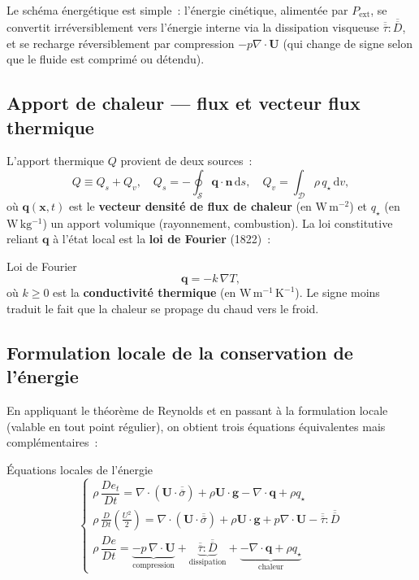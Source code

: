 \documentclass[11pt,a4paper]{report}
\newcommand{\DD}[1]{\dfrac{D #1}{Dt}}
\newcommand{\ten}[1]{\overline{\overline{#1}}}   %
\begin{document}
Le sch\'ema \'energ\'etique est simple~: l'\'energie cin\'etique, aliment\'ee par
$P_{\mathrm{ext}}$, se convertit irr\'eversiblement vers l'\'energie interne via la
dissipation visqueuse $\ten{\tau}:\ten{D}$, et se recharge r\'eversiblement
par compression $-p\nabla\cdot\bm{U}$ (qui change de signe selon que le fluide
est comprim\'e ou d\'etendu).

\subsection{Apport de chaleur --- flux et vecteur flux thermique}

L'apport thermique $Q$ provient de deux sources~:
\[
  Q \equiv Q_s + Q_v,
  \quad
  Q_s = -\oint_{\mathcal{S}} \bm{q} \cdot \bm{n}\,\mathrm{d}s,
  \quad
  Q_v = \int_{\mathcal{D}} \rho\,q_\star\,\mathrm{d}v,
\]
o\`u $\bm{q}(\bm{x},t)$ est le \textbf{vecteur densit\'e de flux de chaleur}
(en $\mathrm{W\,m^{-2}}$) et $q_\star$ (en $\mathrm{W\,kg^{-1}}$) un apport volumique
(rayonnement, combustion). La loi constitutive reliant $\bm{q}$ \`a l'\'etat local est la
\textbf{loi de Fourier} (1822)~:

\begin{defbox}{Loi de Fourier}
\[
  \bm{q} = -k\,\nabla T,
\]
o\`u $k \geq 0$ est la \textbf{conductivit\'e thermique} (en $\mathrm{W\,m^{-1}\,K^{-1}}$).
Le signe moins traduit le fait que la chaleur se propage du chaud vers le froid.
\end{defbox}

\subsection{Formulation locale de la conservation de l'\'energie}

En appliquant le th\'eor\`eme de Reynolds et en passant \`a la formulation locale (valable
en tout point r\'egulier), on obtient trois \'equations \'equivalentes mais compl\'ementaires~:

\begin{importantbox}{\'Equations locales de l'\'energie}
\[
  \begin{cases}
  \displaystyle\rho\,\DD{e_t} = \nabla\cdot(\bm{U}\cdot\ten{\sigma})
                                + \rho\bm{U}\cdot\bm{g}
                                - \nabla\cdot\bm{q} + \rho q_\star
  \\[8pt]
  \displaystyle\rho\,\frac{D}{Dt}\!\left(\frac{U^2}{2}\right)
      = \nabla\cdot(\bm{U}\cdot\ten{\sigma})
        + \rho\bm{U}\cdot\bm{g}
        + p\nabla\cdot\bm{U} - \ten{\tau}:\ten{D}
  \\[8pt]
  \displaystyle\rho\,\DD{e}
      = \underbrace{-p\,\nabla\cdot\bm{U}}_{\text{compression}}
        + \underbrace{\ten{\tau}:\ten{D}}_{\text{dissipation}}
        + \underbrace{-\nabla\cdot\bm{q} + \rho q_\star}_{\text{chaleur}}
  \end{cases}
\]
\end{importantbox}
\end{document}

